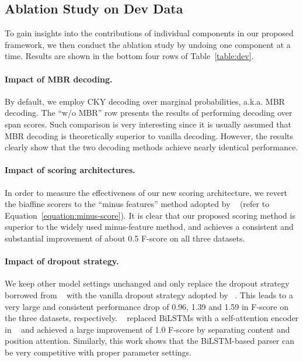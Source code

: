 \documentclass{article}
\begin{document}
\begin{table}[tb]
\begin{table}[tb]
 \subsection{Ablation Study on Dev Data}

To gain insights into the contributions of individual components in our proposed framework,
we then conduct the ablation study by undoing one component at a time. Results are shown in the bottom four rows of Table~\ref{table:dev}.

\paragraph{Impact of MBR decoding.}
By default, we employ CKY decoding over marginal probabilities, a.k.a. MBR decoding.
The ``w/o MBR'' row presents the results of performing decoding over span scores.
Such comparison is very interesting since it is usually assumed that MBR decoding is theoretically superior to vanilla decoding.
However, the results clearly show that
the two decoding methods achieve nearly identical performance.


\paragraph{Impact of scoring architectures.}
In order to measure the effectiveness of our new scoring architecture, we revert the biaffine scorers to the ``minus features'' method adopted by \citeauthor{stern-etal-2017-minimal}~ (refer to Equation~\ref{equation:minus-score}).
It is clear that our proposed scoring method is superior to the widely used minus-feature method, and
achieves a consistent and substantial improvement of about 0.5 F-score on all three datasets.


\paragraph{Impact of dropout strategy.}
We keep other model settings unchanged and only replace the dropout strategy borrowed from \citeauthor{Timothy-d17-biaffine}~ with the vanilla dropout strategy adopted by \citeauthor{stern-etal-2017-minimal}~.
This leads to a very large and consistent performance drop of 0.96, 1.39 and 1.59 in F-score on the three datasets, respectively.
\citeauthor{kitaev-klein-2018-constituency}~ replaced BiLSTMs with a self-attention encoder in \citeauthor{stern-etal-2017-minimal}~ and achieved a large improvement of 1.0 F-score by separating content and position attention.
Similarly, this work shows that the BiLSTM-based parser can be very competitive with proper parameter settings.












\end{table}
\end{table}
\end{document}
